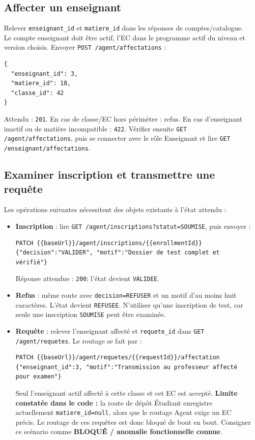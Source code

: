 \documentclass[10pt,a4paper]{article}
\newcommand{\method}[1]{\texttt{\small #1}}
\begin{document}
\subsection{Affecter un enseignant}

Relever \texttt{enseignant\_id} et \texttt{matiere\_id} dans les réponses de comptes/catalogue. Le compte enseignant doit être actif, l’EC dans le programme actif du niveau et version choisis. Envoyer \method{POST /agent/affectations} :
\begin{lstlisting}
{
  "enseignant_id": 3,
  "matiere_id": 18,
  "classe_id": 42
}
\end{lstlisting}

Attendu : \texttt{201}. En cas de classe/EC hors périmètre : refus. En cas d’enseignant inactif ou de matière incompatible : \texttt{422}. Vérifier ensuite \method{GET /agent/affectations}, puis se connecter avec le rôle Enseignant et lire \method{GET /enseignant/affectations}.

\subsection{Examiner inscription et transmettre une requête}

Les opérations suivantes nécessitent des objets existants à l’état attendu :
\begin{itemize}
\item \textbf{Inscription} : lire \method{GET /agent/inscriptions?statut=SOUMISE}, puis envoyer :
\begin{lstlisting}
PATCH {{baseUrl}}/agent/inscriptions/{{enrollmentId}}
{"decision":"VALIDER", "motif":"Dossier de test complet et vérifié"}
\end{lstlisting}
Réponse attendue : \texttt{200}; l’état devient \texttt{VALIDEE}.
\item \textbf{Refus} : même route avec \texttt{decision=REFUSER} et un motif d’au moins huit caractères. L’état devient \texttt{REFUSEE}. N’utiliser qu’une inscription de test, car seule une inscription \texttt{SOUMISE} peut être examinée.
\item \textbf{Requête} : relever l’enseignant affecté et \texttt{requete\_id} dans \method{GET /agent/requetes}. Le routage se fait par :
\begin{lstlisting}
PATCH {{baseUrl}}/agent/requetes/{{requestId}}/affectation
{"enseignant_id":3, "motif":"Transmission au professeur affecté pour examen"}
\end{lstlisting}
Seul l’enseignant actif affecté à cette classe et cet EC est accepté. \textbf{Limite constatée dans le code :} la route de dépôt Étudiant enregistre actuellement \texttt{matiere\_id=null}, alors que le routage Agent exige un EC précis. Le routage de ces requêtes est donc bloqué de bout en bout. Consigner ce scénario comme \textbf{BLOQUÉ / anomalie fonctionnelle connue}.
\end{itemize}
\end{document}
